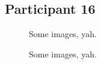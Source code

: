 
\clearpage

\subsection{Participant 16}

\begin{figure}[h]
	\caption{Some images, yah.}
\end{figure}

\lipsum[1]

\clearpage

\begin{figure}[h]
	\caption{Some images, yah.}
\end{figure}

\lipsum[1]


